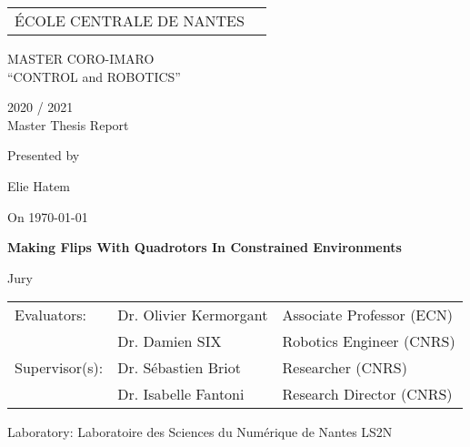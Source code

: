 \thispagestyle{empty}

\def\lskip{\vspace{0.5cm}}


\begin{tabular}{p{7cm}p{8cm}}
ÉCOLE CENTRALE DE NANTES
&
\end{tabular}

\vspace{2cm}

\begin{center} \large\sc MASTER CORO-IMARO\\ \normalsize{``CONTROL and ROBOTICS''} \end{center}



\begin{center}
	2020 / 2021\\
	\lskip
	Master Thesis Report %
	\lskip
	
	Presented by \lskip 
	
	Elie Hatem \lskip
	
	On \today \lskip\lskip
	
	{\Large \textbf{Making Flips With Quadrotors In Constrained Environments}}
	
	\vfill

Jury \lskip
		
	\end{center}
	


\begin{tabular}{p{3cm}p{7cm}p{5cm} }
 Evaluators: & Dr. Olivier Kermorgant & Associate Professor (ECN) \\
	      & Dr. Damien SIX & Robotics Engineer (CNRS) \\ 
  Supervisor(s):  & Dr. Sébastien Briot & Researcher (CNRS) \\
		  & Dr. Isabelle Fantoni & Research Director (CNRS) \\
\end{tabular}

\lskip

\begin{flushleft}
 Laboratory: Laboratoire des Sciences du Numérique de Nantes LS2N
\end{flushleft}

\newpage
\thispagestyle{empty}
\null
\newpage
\addtocounter{page}{-1}
\pagestyle{fancy}
